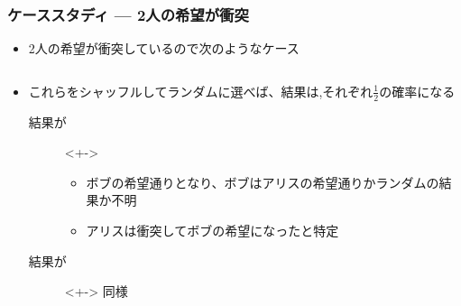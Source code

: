 \begin{frame}
  \frametitle{ケーススタディ --- 2人の希望が衝突}

  \begin{itemize}
    \item<+-> 2人の希望が衝突しているので次のようなケース
      \begin{columns}
        \begin{column}{0.5\textwidth}
        \end{column}
        \begin{column}{0.5\textwidth}
        \end{column}
      \end{columns}

    \item<+-> これらをシャッフルしてランダムに選べば、結果は\heartcard,\clubcard それぞれ$\frac{1}{2}$の確率になる
    \begin{description}
      \item[結果が\clubcard]<+->\mbox{}\\
      \begin{itemize}
        \item ボブの希望通りとなり、ボブはアリスの希望通りかランダムの結果か不明
        \item アリスは衝突してボブの希望\clubcard になったと特定
      \end{itemize}

      \item[結果が\heartcard]<+-> 同様
    \end{description}
  \end{itemize}
\end{frame}

